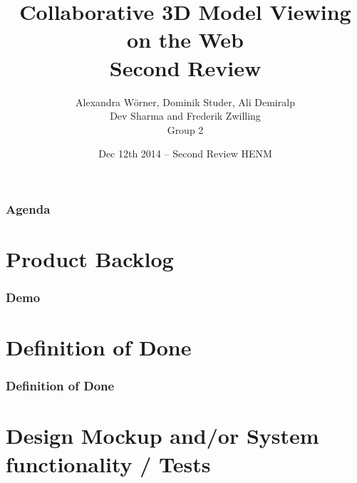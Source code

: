 

\title[Collaborative 3D Model Viewing on the Web]{Collaborative 3D Model Viewing on the Web\\ Second Review}
\author[Group 2]{%
  Alexandra Wörner, Dominik Studer, Ali Demiralp\\ Dev Sharma and Frederik Zwilling \\
  \bigskip
  {\scriptsize Group 2}
}

\date[Dec 12th 2014 @ HENM 2014]{Dec 12th 2014 -- Second Review HENM}



\frame[plain]{\titlepage}
\addtocounter{framenumber}{-1}

\begin{frame}
  \frametitle{Agenda}
  \tableofcontents[hideallsubsections]
\end{frame}

\section{Product Backlog}

\begin{frame}
  \frametitle{Demo}
\end{frame}

\section{Definition of Done}

\begin{frame}
  \frametitle{Definition of Done}
\end{frame}

\section{Design Mockup and/or System functionality / Tests}

